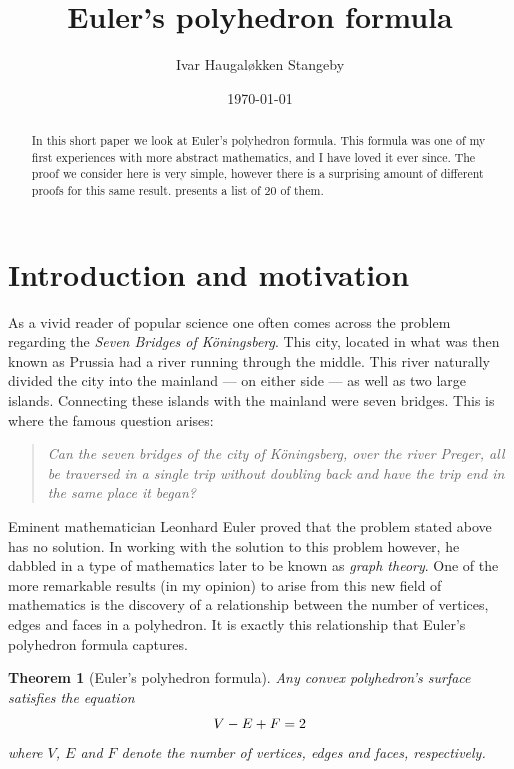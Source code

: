 \documentclass{amsart}
\title{Euler's polyhedron formula}
\author{Ivar Haugal{\o}kken Stangeby}
\date{\today}
\theoremstyle{plain}
\newtheorem{theorem}{Theorem}
\theoremstyle{definition}
\begin{document}
\begin{abstract}
   In this short paper we look at Euler's polyhedron formula. This formula was
   one of my first experiences with more abstract mathematics, and I have loved
   it ever since. The proof we consider here is very simple, however there is a
   surprising amount of different proofs for this same result. \cite{proofs}
   presents a list of 20 of them.
\end{abstract}
\maketitle

\tableofcontents

\section{Introduction and motivation}
\label{sec:introduction_and_motivation}

As a vivid reader of popular science one often comes across the problem
regarding the \emph{Seven Bridges of K{\"o}ningsberg}. This city, located in
what was then known as Prussia had a river running through the middle. This
river naturally divided the city into the mainland --- on either side --- as
well as two large islands. Connecting these islands with the mainland were
seven bridges. This is where the famous question arises:

\begin{quote}
    \emph{Can the seven bridges of the city of K{\"o}ningsberg, over the river
    Preger, all be traversed in a single trip without doubling back and have
    the trip end in the same place it began?}  
\end{quote}

Eminent mathematician Leonhard Euler proved that the problem stated above has
no solution. In working with the solution to this problem however, he dabbled
in a type of mathematics later to be known as \emph{graph theory}. One of the
more remarkable results (in my opinion) to arise from this new field of
mathematics is the discovery of a relationship between the number of vertices,
edges and faces in a polyhedron. It is exactly this relationship that Euler's
polyhedron formula captures.

\begin{theorem}[Euler's polyhedron formula]
    Any convex polyhedron's surface satisfies the equation
    \begin{equation}
        \notag
        V - E + F = 2
    \end{equation}
    where $V$, $E$ and $F$ denote the number of vertices, edges and faces,
    respectively.
\end{theorem}
\end{document}
